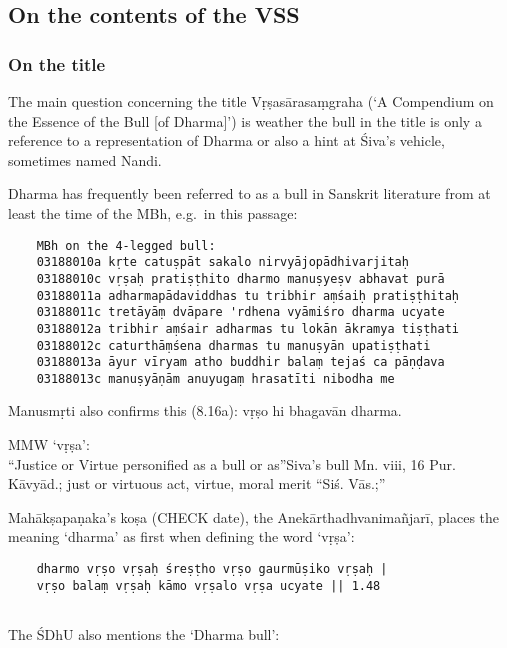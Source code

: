 \documentclass[]{article}
\begin{document}
\hypertarget{on-the-contents-of-the-vss}{%
\subsection{On the contents of the
VSS}\label{on-the-contents-of-the-vss}}

\hypertarget{on-the-title}{%
\subsubsection{On the title}\label{on-the-title}}

The main question concerning the title Vṛṣasārasaṃgraha (`A Compendium
on the Essence of the Bull {[}of Dharma{]}') is weather the bull in the
title is only a reference to a representation of Dharma or also a hint
at Śiva's vehicle, sometimes named Nandi.

Dharma has frequently been referred to as a bull in Sanskrit literature
from at least the time of the MBh, e.g.~in this passage:

\begin{verbatim}
    MBh on the 4-legged bull:
    03188010a kṛte catuṣpāt sakalo nirvyājopādhivarjitaḥ
    03188010c vṛṣaḥ pratiṣṭhito dharmo manuṣyeṣv abhavat purā
    03188011a adharmapādaviddhas tu tribhir aṃśaiḥ pratiṣṭhitaḥ
    03188011c tretāyāṃ dvāpare 'rdhena vyāmiśro dharma ucyate
    03188012a tribhir aṃśair adharmas tu lokān ākramya tiṣṭhati
    03188012c caturthāṃśena dharmas tu manuṣyān upatiṣṭhati
    03188013a āyur vīryam atho buddhir balaṃ tejaś ca pāṇḍava
    03188013c manuṣyāṇām anuyugaṃ hrasatīti nibodha me
\end{verbatim}

Manusmṛti also confirms this (8.16a): vṛṣo hi bhagavān dharma.

MMW `vṛṣa':\\
``Justice or Virtue personified as a bull or as''Siva's bull Mn. viii,
16 Pur. Kāvyād.; just or virtuous act, virtue, moral merit ``Siś.
Vās.;''

Mahākṣapaṇaka's koṣa (CHECK date), the Anekārthadhvanimañjarī, places
the meaning `dharma' as first when defining the word `vṛṣa':

\begin{verbatim}
    dharmo vṛṣo vṛṣaḥ śreṣṭho vṛṣo gaurmūṣiko vṛṣaḥ |
    vṛṣo balaṃ vṛṣaḥ kāmo vṛṣalo vṛṣa ucyate || 1.48
    
\end{verbatim}

The ŚDhU also mentions the `Dharma bull':
\end{document}
